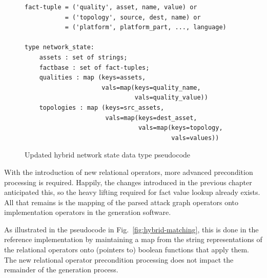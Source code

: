 \begin{figure}
\begin{lstlisting}
fact-tuple = ('quality', asset, name, value) or
           = ('topology', source, dest, name) or
           = ('platform', platform_part, ..., language)

type network_state:
    assets : set of strings;
    factbase : set of fact-tuples;
    qualities : map (keys=assets, 
                     vals=map(keys=quality_name,
                              vals=quality_value))
    topologies : map (keys=src_assets, 
                      vals=map(keys=dest_asset,
                               vals=map(keys=topology,
                                        vals=values))
\end{lstlisting}
\caption{Updated hybrid network state data type pseudocode}
\label{fig:netstate_map_hybrid_pc}
\end{figure}
With the introduction of new relational operators, more advanced
precondition processing is required. Happily, the changes introduced
in the previous chapter anticipated this, so the heavy lifting required for
fact value lookup already exists. All that remains is the mapping of the
parsed attack graph operators onto implementation operators in the generation
software.

As illustrated in the pseudocode in Fig.~\ref{fig:hybrid-matching}, this is
done in the reference implementation by maintaining a map from the string
representations of the relational operators onto (pointers to) boolean 
functions that apply
them. The new relational operator precondition processing does not impact the
remainder of the generation process.

